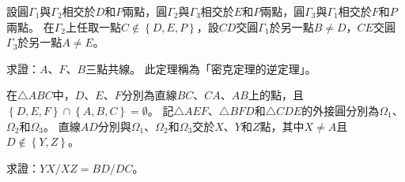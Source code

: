 \documentclass[12pt]{article}
\begin{document}
\begin{mybox}[Problem 4]{6.5em}{1em}{0.5em}
    設圓$\Gamma_1$與$\Gamma_2$相交於$D$和$P$兩點，圓$\Gamma_2$與$\Gamma_3$相交於$E$和$P$兩點，圓$\Gamma_3$與$\Gamma_1$相交於$F$和$P$兩點。
    在$\Gamma_2$上任取一點$C\notin\left\{D,E,P\right\}$，設$CD$交圓$\Gamma_1$於另一點$B\neq D$，$CE$交圓$\Gamma_3$於另一點$A\neq E$。

    求證：$A$、$F$、$B$三點共線。
    此定理稱為「密克定理的逆定理」。
\end{mybox}
\iftoggle{showanswer}{
\begin{mybox}[證明]{4em}{1em}{0.5em}
    原命題等價於以下的命題一
    $$
        \measuredangle{PFA}=\measuredangle{PFB}
    $$
    因為$A$、$E$、$F$、$P$四點共圓$\Gamma_3$，所以有$\measuredangle{PFA}=\measuredangle{PEA}$。

    因為$B$、$F$、$D$、$P$四點共圓$\Gamma_1$，所以有$\measuredangle{PFB}=\measuredangle{PDB}$。

    所以命題一等價於以下的命題二
    $$
        \measuredangle{PEA}=\measuredangle{PDB}
    $$
    因為$C$、$E$、$A$三點共線，所以有$\measuredangle{PEA}=\measuredangle{PEC}$。

    因為$B$、$D$、$C$三點共線，所以有$\measuredangle{PDB}=\measuredangle{PDC}$。

    所以命題二可以等價於以下的命題三
    $$
        \measuredangle{PEC}=\measuredangle{PDC}
    $$
    因為$C$、$D$、$E$、$P$四點共圓$\Gamma_2$，所以有$\measuredangle{PEC}=\measuredangle{PDC}$，命題二成立，原命題得證。
\end{mybox}
}{}
\begin{mybox}[Problem 5]{6.5em}{1em}{0.5em}
    在$\triangle{ABC}$中，$D$、$E$、$F$分別為直線$BC$、$CA$、$AB$上的點，且$\left\{D,E,F\right\}\cap\left\{A,B,C\right\}=\emptyset$。
    記$\triangle{AEF}$、$\triangle{BFD}$和$\triangle{CDE}$的外接圓分別為$\Omega_1$、$\Omega_2$和$\Omega_3$。
    直線$AD$分別與$\Omega_1$、$\Omega_2$和$\Omega_3$交於$X$、$Y$和$Z$點，其中$X\neq A$且$D\notin\left\{Y,Z\right\}$。

    求證：$YX/XZ=BD/DC$。
\end{mybox}
\end{document}
